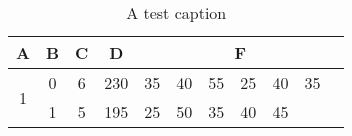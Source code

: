 
% 

\begin{table}[htbp]
\centering
\begin{tabular}{|c|c|c|c|p{1cm}p{1cm}p{1cm}p{1cm}p{1cm}p{1cm}p{1cm}|}
\hline
A & B & C & D & \multicolumn{7}{|c|}{F}  \\ \hline
\multirow{ 2}{*}{1} & 0 & 6 & 230 & 35 & 40 & 55 & 25 & 40 & 35 & \\
& 1 & 5 & 195 & 25 & 50 & 35 & 40 & 45 &  &  \\ \hline
\end{tabular}
\caption{A test caption}
\label{table2}
\end{table}

% 